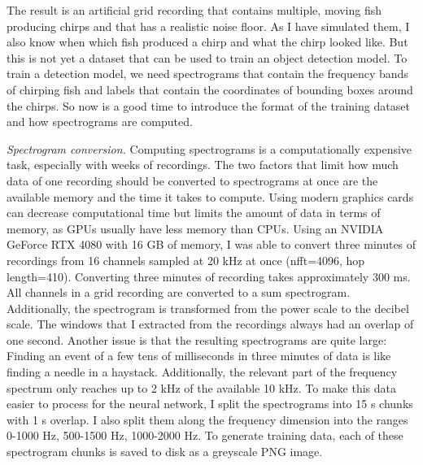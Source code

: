 The result is an artificial grid recording that contains multiple, moving fish
producing chirps and that has a realistic noise floor. As I have simulated
them, I also know when which fish produced a chirp and what the chirp looked
like. But this is not yet a dataset that can be used to train an object
detection model. To train a detection model, we need spectrograms that contain
the frequency bands of chirping fish and labels that contain the coordinates of
bounding boxes around the chirps. So now is a good time to introduce the format
of the training dataset and how spectrograms are computed.

\emph{Spectrogram conversion.}\label{sec:spectrogramconversion} Computing
spectrograms is a computationally expensive task, especially with weeks of
recordings. The two factors that limit how much data of one recording should be
converted to spectrograms at once are the available memory and the time it
takes to compute. Using modern graphics cards can decrease computational time
but limits the amount of data in terms of memory, as \acrshort{GPU}s usually
have less memory than \acrshort{CPU}s. Using an NVIDIA GeForce RTX 4080 with 16
GB of memory, I was able to convert three minutes of recordings from 16
channels sampled at 20 \si{\kilo\hertz} at once (nfft=4096, hop length=410). Converting three minutes of recording takes
approximately 300 \si{\milli\second}. All channels in a grid recording are
converted to a sum spectrogram. Additionally, the spectrogram is transformed
from the power scale to the decibel scale. The windows that I extracted from
the recordings always had an overlap of one second. Another issue is that the
resulting spectrograms are quite large: Finding an event of a few tens of
milliseconds in three minutes of data is like finding a needle in a haystack.
Additionally, the relevant part of the frequency spectrum only reaches up to 2
\si{\kilo\hertz} of the available 10 \si{\kilo\hertz}. To make this data easier
to process for the neural network, I split the spectrograms into 15
\si{\second} chunks with 1 \si{\second} overlap. I also split them along the
frequency dimension into the ranges 0-1000 \si{\hertz}, 500-1500 \si{\hertz},
1000-2000 \si{\hertz}. To generate training data, each of these spectrogram
chunks is saved to disk as a greyscale PNG image.

